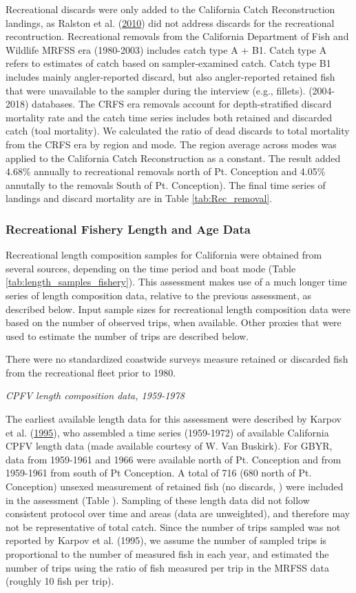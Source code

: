 \documentclass[12pt,]{article}
\begin{document}
Recreational discards were only added to the California Catch
Reconstruction landings, as Ralston et al.
(\protect\hyperlink{ref-Ralston2010}{2010}) did not address discards for
the recreational recontruction. Recreational removals from the
California Department of Fish and Wildlife MRFSS era (1980-2003)
includes catch type A + B1. Catch type A refers to estimates of catch
based on sampler-examined catch. Catch type B1 includes mainly
angler-reported discard, but also angler-reported retained fish that
were unavailable to the sampler during the interview (e.g., fillets).
(2004-2018) databases. The CRFS era removals account for
depth-stratified discard mortality rate and the catch time series
includes both retained and discarded catch (toal mortality). We
calculated the ratio of dead discards to total mortality from the CRFS
era by region and mode. The region average across modes was applied to
the California Catch Reconstruction as a constant. The result added
4.68\% annually to recreational removals north of Pt. Conception and
4.05\% annutally to the removals South of Pt. Conception). The final
time series of landings and discard mortality are in Table
\ref{tab:Rec_removal}.

\subsubsection{Recreational Fishery Length and Age
Data}\label{recreational-fishery-length-and-age-data}

Recreational length composition samples for California were obtained
from several sources, depending on the time period and boat mode (Table
\ref{tab:length_samples_fishery}). This assessment makes use of a much
longer time series of length composition data, relative to the previous
assessment, as described below. Input sample sizes for recreational
length composition data were based on the number of observed trips, when
available. Other proxies that were used to estimate the number of trips
are described below.

There were no standardized coastwide surveys measure retained or
discarded fish from the recreational fleet prior to 1980.

\emph{CPFV length composition data, 1959-1978}

The earliest available length data for this assessment were described by
Karpov et al. (\protect\hyperlink{ref-Karpov1995}{1995}), who assembled
a time series (1959-1972) of available California CPFV length data (made
available courtesy of W. Van Buskirk). For GBYR, data from 1959-1961 and
1966 were available north of Pt. Conception and from 1959-1961 from
south of Pt Conception. A total of 716 (680 north of Pt. Conception)
unsexed measurement of retained fish (no discards, ) were included in
the assessment (Table ). Sampling of these length data did not follow
consistent protocol over time and areas (data are unweighted), and
therefore may not be representative of total catch. Since the number of
trips sampled was not reported by Karpov et al. (1995), we assume the
number of sampled trips is proportional to the number of measured fish
in each year, and estimated the number of trips using the ratio of fish
measured per trip in the MRFSS data (roughly 10 fish per trip).
\end{document}
